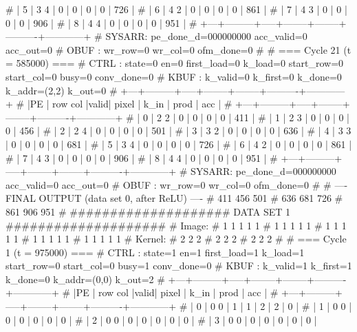# | 5 |   3   4 |  0  |      0 |      0 |        0 |        726 |
# | 6 |   4   2 |  0  |      0 |      0 |        0 |        861 |
# | 7 |   4   3 |  0  |      0 |      0 |        0 |        906 |
# | 8 |   4   4 |  0  |      0 |      0 |        0 |        951 |
# +---+---------+-----+--------+--------+----------+------------+
# SYSARR: pe_done_d=000000000 acc_valid=0 acc_out=0
# OBUF : wr_row=0 wr_col=0 ofm_done=0
# 
# === Cycle 21  (t = 585000) ===
# CTRL : state=0 en=0 first_load=0 k_load=0 start_row=0 start_col=0 busy=0 conv_done=0
# KBUF : k_valid=0 k_first=0 k_done=0 k_addr=(2,2) k_out=0
# +---+---------+-----+--------+--------+----------+------------+
# |PE | row col |valid| pixel  |  k_in  |   prod   |    acc     |
# +---+---------+-----+--------+--------+----------+------------+
# | 0 |   2   2 |  0  |      0 |      0 |        0 |        411 |
# | 1 |   2   3 |  0  |      0 |      0 |        0 |        456 |
# | 2 |   2   4 |  0  |      0 |      0 |        0 |        501 |
# | 3 |   3   2 |  0  |      0 |      0 |        0 |        636 |
# | 4 |   3   3 |  0  |      0 |      0 |        0 |        681 |
# | 5 |   3   4 |  0  |      0 |      0 |        0 |        726 |
# | 6 |   4   2 |  0  |      0 |      0 |        0 |        861 |
# | 7 |   4   3 |  0  |      0 |      0 |        0 |        906 |
# | 8 |   4   4 |  0  |      0 |      0 |        0 |        951 |
# +---+---------+-----+--------+--------+----------+------------+
# SYSARR: pe_done_d=000000000 acc_valid=0 acc_out=0
# OBUF : wr_row=0 wr_col=0 ofm_done=0
# 
# ---- FINAL OUTPUT (data set 0, after ReLU) ----
#          411        456        501
#          636        681        726
#          861        906        951
# 
#################### DATA SET 1 ####################
# Image:
#      1    1    1    1    1
#      1    1    1    1    1
#      1    1    1    1    1
#      1    1    1    1    1
#      1    1    1    1    1
# Kernel:
#      2    2    2
#      2    2    2
#      2    2    2
# 
# === Cycle 1  (t = 975000) ===
# CTRL : state=1 en=1 first_load=1 k_load=1 start_row=0 start_col=0 busy=1 conv_done=0
# KBUF : k_valid=1 k_first=1 k_done=0 k_addr=(0,0) k_out=2
# +---+---------+-----+--------+--------+----------+------------+
# |PE | row col |valid| pixel  |  k_in  |   prod   |    acc     |
# +---+---------+-----+--------+--------+----------+------------+
# | 0 |   0   0 |  1  |      1 |      2 |        2 |          0 |
# | 1 |   0   0 |  0  |      0 |      0 |        0 |          0 |
# | 2 |   0   0 |  0  |      0 |      0 |        0 |          0 |
# | 3 |   0   0 |  0  |      0 |      0 |        0 |          0 |
